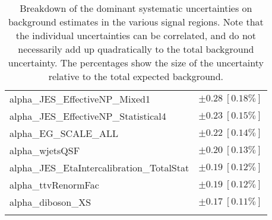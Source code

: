 \begin{table}
\begin{center}
\begin{tabular*}{\textwidth}{@{\extracolsep{\fill}}lc}
alpha\_JES\_EffectiveNP\_Mixed1         & $\pm 0.28\ [0.18\%] $       \\
alpha\_JES\_EffectiveNP\_Statistical4         & $\pm 0.23\ [0.15\%] $       \\
alpha\_EG\_SCALE\_ALL         & $\pm 0.22\ [0.14\%] $       \\
alpha\_wjetsQSF         & $\pm 0.20\ [0.13\%] $       \\
alpha\_JES\_EtaIntercalibration\_TotalStat         & $\pm 0.19\ [0.12\%] $       \\
alpha\_ttvRenormFac         & $\pm 0.19\ [0.12\%] $       \\
alpha\_diboson\_XS         & $\pm 0.17\ [0.11\%] $       \\
\noalign{\smallskip}\hline\noalign{\smallskip}
\end{tabular*}
\end{center}
\caption[Breakdown of uncertainty on background estimates]{
Breakdown of the dominant systematic uncertainties on background estimates in the various signal regions.
Note that the individual uncertainties can be correlated, and do not necessarily add up quadratically to 
the total background uncertainty. The percentages show the size of the uncertainty relative to the total expected background.
\label{table.results.bkgestimate.uncertainties.STCREM_cuts}}
\end{table}
%